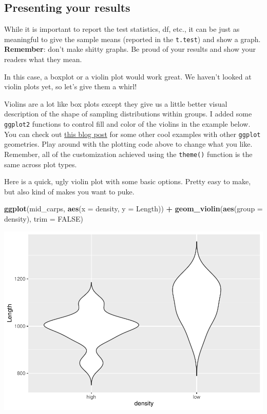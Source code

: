 \documentclass[
]{book}
\newenvironment{Shaded}{\begin{snugshade}}{\end{snugshade}}
\newcommand{\DataTypeTok}[1]{\textcolor[rgb]{0.13,0.29,0.53}{#1}}
\newcommand{\KeywordTok}[1]{\textcolor[rgb]{0.13,0.29,0.53}{\textbf{#1}}}
\newcommand{\NormalTok}[1]{#1}
\newcommand{\OperatorTok}[1]{\textcolor[rgb]{0.81,0.36,0.00}{\textbf{#1}}}
\newcommand{\OtherTok}[1]{\textcolor[rgb]{0.56,0.35,0.01}{#1}}
\newcommand{\StringTok}[1]{\textcolor[rgb]{0.31,0.60,0.02}{#1}}
\begin{document}
\hypertarget{presenting-your-results}{%
\subsection{Presenting your results}\label{presenting-your-results}}

While it is important to report the test statistics, df, etc., it can be just as meaningful to give the sample means (reported in the \texttt{t.test}) and show a graph. \textbf{Remember}: don't make shitty graphs. Be proud of your results and show your readers what they mean.

In this case, a boxplot or a violin plot would work great. We haven't looked at violin plots yet, so let's give them a whirl!

Violins are a lot like box plots except they give us a little better visual description of the shape of sampling distributions within groups. I added some \texttt{ggplot2} functions to control fill and color of the violins in the example below. You can check out \href{https://www.datanovia.com/en/blog/ggplot-colors-best-tricks-you-will-love/\#predefined-ggplot-color-palettes}{this blog post} for some other cool examples with other \texttt{ggplot} geometries. Play around with the plotting code above to change what you like. Remember, all of the customization achieved using the \texttt{theme()} function is the same across plot types.

Here is a quick, ugly violin plot with some basic options. Pretty easy to make, but also kind of makes you want to puke.

\begin{Shaded}
\begin{Highlighting}[]
\KeywordTok{ggplot}\NormalTok{(mid_carps, }\KeywordTok{aes}\NormalTok{(}\DataTypeTok{x =}\NormalTok{ density, }\DataTypeTok{y =}\NormalTok{ Length)) }\OperatorTok{+}\StringTok{ }
\StringTok{  }\KeywordTok{geom_violin}\NormalTok{(}\KeywordTok{aes}\NormalTok{(}\DataTypeTok{group =}\NormalTok{ density), }\DataTypeTok{trim =} \OtherTok{FALSE}\NormalTok{)}
\end{Highlighting}
\end{Shaded}

\includegraphics{worstr_files/figure-latex/unnamed-chunk-175-1.pdf}
\end{document}
